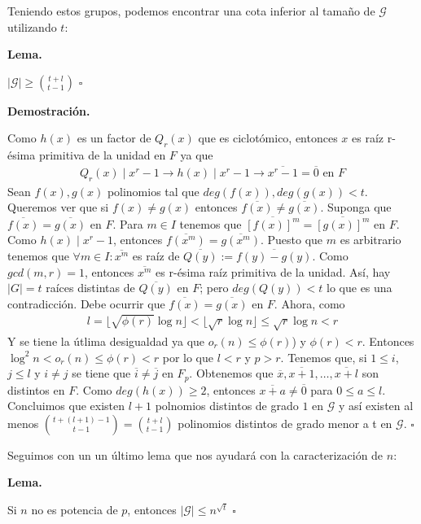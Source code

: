 \documentclass{article}
\newenvironment{dem}{\par\noindent\textbf{Demostración.}\par}{\hfill$\square$\par}
\newenvironment{lem}{\par\noindent\textbf{Lema.}\par}{\hfill$\square$\par}
\begin{document}
Teniendo estos grupos, podemos encontrar una cota inferior al tamaño de $\mathcal{G}$ utilizando $t$:
\begin{lem}
$|\mathcal{G}|\geq \binom{t+l}{t-1}$
\end{lem}
\begin{dem}
    Como $h(x)$ es un factor de $Q_r(x)$ que es ciclotómico, entonces $x$ es raíz r-ésima primitiva de la unidad en $F$ ya que 
    \begin{align}
        Q_r(x)\mid x^r-1 \to h(x)\mid x^r-1 \to \overline{x^r-1}=\overline{0} \text{ en } F
    \end{align}
    Sean $f(x),g(x)$ polinomios tal que $deg(f(x)),deg(g(x))<t$. Queremos ver que si $f(x)\neq g(x)$ entonces $\overline{f(x)}\neq \overline{g(x)}$. Suponga que $\overline{f(x)}=\overline{g(x)}$ en $F$. Para $m \in I$ tenemos que $\overline{[f(x)]^m}=\overline{[g(x)]^m}$ en $F$. Como $h(x)\mid x^r-1$, entonces $\overline{f(x^m)}=\overline{g(x^m)}$.
    Puesto que $m$ es arbitrario tenemos que $\forall m \in I: \overline{x^m}$ es raíz de $\overline{Q(y)}:=\overline{f(y)-g(y)}$. Como $gcd(m,r)=1$, entonces $\overline{x^m}$ es r-ésima raíz primitiva de la unidad. Así, hay $|G|=t$ raíces distintas de $\overline{Q(y)}$ en $F$; pero $deg(Q(y))<t$ lo que es una contradicción. Debe ocurrir que $\overline{f(x)}=\overline{g(x)}$ en $F$.
    Ahora, como
    \begin{align*}
         l=\lfloor \sqrt{\phi(r)}\log n\rfloor<\lfloor\sqrt{r}\log n\rfloor \leq \sqrt{r}\log n<r
    \end{align*}
    Y se tiene la útlima desigualdad ya que $o_r(n)\leq \phi(r)$) y $\phi(r)<r$. Entonces $\log^2n<o_r(n)\leq \phi(r)<r$ por lo que $l<r$ y $p>r$. Tenemos que, si $1\leq i $, $j \leq l$ y $i\neq j$ se tiene que $\overline{i} \neq \overline{j}$ en $F_p$.
    Obtenemos que $\overline{x}, \overline{x+1}, \dots, \overline{x+l}$ son distintos en $F$. Como $deg(h(x))\geq 2$, entonces $ \overline{x+a} \neq \overline{0}$ para $0\leq a \leq l$. Concluimos que existen $l+1$ polnomios distintos de grado $1$ en $\mathcal{G}$ y así existen al menos $\binom{t+(l+1)-1}{t-1}=\binom{t+l}{t-1}$ polinomios distintos de grado menor a t en $\mathcal{G}$.
\end{dem}
Seguimos con un un último lema que nos ayudará con la caracterización de $n$:
\begin{lem}
Si $n$ no es potencia de $p$, entonces $|\mathcal{G}|\leq n^{\sqrt{t}}$
\end{lem}
\end{document}

